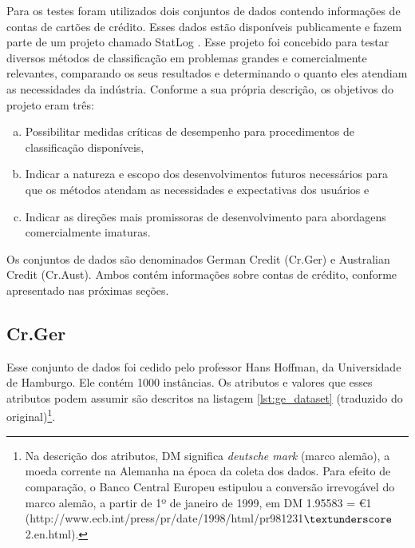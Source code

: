 Para os testes foram utilizados dois conjuntos de dados contendo informações de contas de cartões de crédito. Esses dados estão disponíveis publicamente e fazem parte de um projeto chamado StatLog \cite{Michie1994}. Esse projeto foi concebido para testar diversos métodos de classificação em problemas grandes e comercialmente relevantes, comparando os seus resultados e determinando o quanto eles atendiam as necessidades da indústria. Conforme a sua própria descrição, os objetivos do projeto eram três:

\begin{enumerate}[a)]
    \item Possibilitar medidas críticas de desempenho para procedimentos de classificação disponíveis,
    \item Indicar a natureza e escopo dos desenvolvimentos futuros necessários para que os métodos atendam as necessidades e expectativas dos usuários e
    \item Indicar as direções mais promissoras de desenvolvimento para abordagens comercialmente imaturas.
\end{enumerate}

Os conjuntos de dados são denominados German Credit (Cr.Ger) e Australian Credit (Cr.Aust). Ambos contém informações sobre contas de crédito, conforme apresentado nas próximas seções.

\subsection{Cr.Ger}

Esse conjunto de dados foi cedido pelo professor Hans Hoffman, da Universidade de Hamburgo. Ele contém 1000 instâncias. Os atributos e valores que esses atributos podem assumir são descritos na listagem \ref{lst:ge_dataset} (traduzido do original)\footnote{Na descrição dos atributos, DM significa \emph{deutsche mark} (marco alemão), a moeda corrente na Alemanha na época da coleta dos dados. Para efeito de comparação, o Banco Central Europeu estipulou a conversão irrevogável do marco alemão, a partir de 1º de janeiro de 1999, em DM 1.95583 = \euro 1 (http://www.ecb.int/press/pr/date/1998/html/pr981231$\textunderscore$2.en.html).}.

